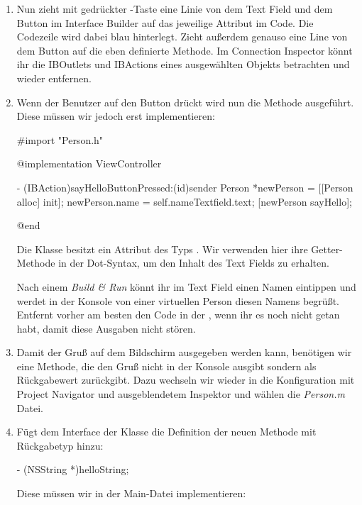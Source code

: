 \documentclass[parskip=half, final]{scrreprt}
\begin{document}
\begin{lecture}
\begin{enumerate}
\item Nun zieht mit gedrückter \keys{\ctrlkey}-Taste eine Linie von dem Text Field und dem Button im Interface Builder auf das jeweilige Attribut im Code. Die Codezeile wird dabei blau hinterlegt. Zieht außerdem genauso eine Line von dem Button auf die eben definierte Methode. Im Connection Inspector könnt ihr die IBOutlets und IBActions eines ausgewählten Objekts betrachten und wieder entfernen.

\item Wenn der Benutzer auf den Button drückt wird nun die Methode  ausgeführt. Diese müssen wir jedoch erst implementieren:

\begin{objclst}
#import "Person.h"

@implementation ViewController

- (IBAction)sayHelloButtonPressed:(id)sender {
    Person *newPerson = [[Person alloc] init];
    newPerson.name = self.nameTextfield.text;
    [newPerson sayHello];
}

@end
\end{objclst}

Die Klasse  besitzt ein Attribut  des Typs . Wir verwenden hier ihre Getter-Methode in der Dot-Syntax, um den Inhalt des Text Fields zu erhalten.

Nach einem \emph{Build \& Run} könnt ihr im Text Field einen Namen eintippen und werdet in der Konsole von einer virtuellen Person diesen Namens begrüßt. Entfernt vorher am besten den Code in der , wenn ihr es noch nicht getan habt, damit diese Ausgaben nicht stören.

\item Damit der Gruß auf dem Bildschirm ausgegeben werden kann, benötigen wir eine Methode, die den Gruß nicht in der Konsole ausgibt sondern als Rückgabewert zurückgibt. Dazu wechseln wir wieder in die Konfiguration mit Project Navigator und ausgeblendetem Inspektor und wählen die \emph{Person.m} Datei.

\item Fügt dem Interface der Klasse  die Definition der neuen Methode  mit Rückgabetyp  hinzu:
\begin{objclst}
- (NSString *)helloString;
\end{objclst}

Diese müssen wir in der Main-Datei implementieren:


\end{enumerate}
\end{lecture}
\end{document}
